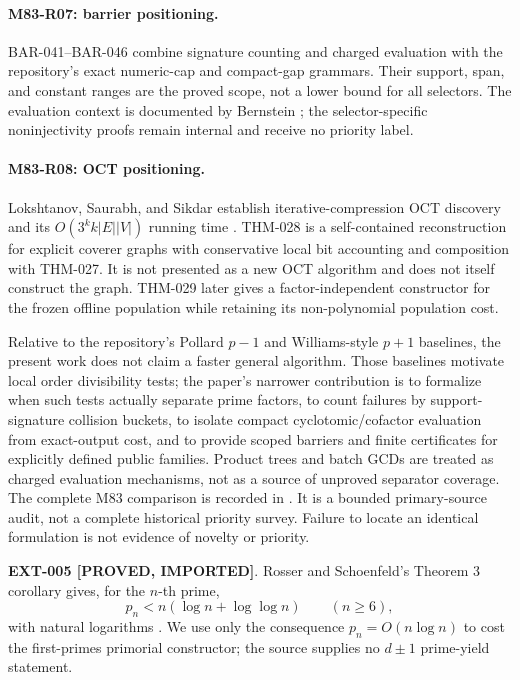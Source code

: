 \documentclass[11pt]{article}
\newcommand{\claimstatus}[2]{\textbf{#1 [#2]}}
\begin{document}
\paragraph{M83-R07: barrier positioning.}
BAR-041--BAR-046 combine signature counting and charged evaluation with the
repository's exact numeric-cap and compact-gap grammars. Their support, span,
and constant ranges are the proved scope, not a lower bound for all
selectors. The evaluation context is documented by Bernstein
\cite{bernstein2004smoothparts}; the selector-specific noninjectivity proofs
remain internal and receive no priority label.

\paragraph{M83-R08: OCT positioning.}
Lokshtanov, Saurabh, and Sikdar establish iterative-compression OCT
discovery and its \(O(3^k k|E||V|)\) running time
\cite{lokshtanov2009oct}. THM-028 is a self-contained reconstruction for
explicit coverer graphs with conservative local bit accounting and
composition with THM-027. It is not presented as a new OCT algorithm and
does not itself construct the graph. THM-029 later gives a
factor-independent constructor for the frozen offline population while
retaining its non-polynomial population cost.

Relative to the repository's Pollard \(p-1\) and Williams-style \(p+1\)
baselines, the present work does not claim a faster general algorithm. Those
baselines motivate local order divisibility tests; the paper's narrower
contribution is to formalize when such tests actually separate prime factors,
to count failures by support-signature collision buckets, to isolate compact
cyclotomic/cofactor evaluation from exact-output cost, and to provide scoped
barriers and finite certificates for explicitly defined public families.
Product trees and batch GCDs are treated as charged evaluation mechanisms,
not as a source of unproved separator coverage. The complete M83 comparison
is recorded in
. It is a bounded
primary-source audit, not a complete historical priority survey. Failure to
locate an identical formulation is not evidence of novelty or priority.

\claimstatus{EXT-005}{PROVED, IMPORTED}. Rosser and Schoenfeld's Theorem 3
corollary gives, for the \(n\)-th prime,
\[
p_n<n(\log n+\log\log n)\qquad(n\ge6),
\]
with natural logarithms \cite{rosser1962approximate}. We use only the
consequence \(p_n=O(n\log n)\) to cost the first-primes primorial constructor;
the source supplies no \(d\pm1\) prime-yield statement.
\end{document}
